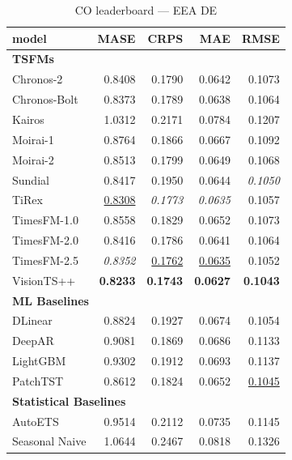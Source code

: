 \begin{table}[H]
\caption{CO leaderboard --- EEA DE}
\centering
\begin{small}
\begin{tabular}{lrrrr}
\toprule
model & MASE & CRPS & MAE & RMSE \\
\midrule
\multicolumn{5}{l}{\textbf{TSFMs}} \\
Chronos-2 & 0.8408 & 0.1790 & 0.0642 & 0.1073 \\
Chronos-Bolt & 0.8373 & 0.1789 & 0.0638 & 0.1064 \\
Kairos & 1.0312 & 0.2171 & 0.0784 & 0.1207 \\
Moirai-1 & 0.8764 & 0.1866 & 0.0667 & 0.1092 \\
Moirai-2 & 0.8513 & 0.1799 & 0.0649 & 0.1068 \\
Sundial & 0.8417 & 0.1950 & 0.0644 & \textit{0.1050} \\
TiRex & \underline{0.8308} & \textit{0.1773} & \textit{0.0635} & 0.1057 \\
TimesFM-1.0 & 0.8558 & 0.1829 & 0.0652 & 0.1073 \\
TimesFM-2.0 & 0.8416 & 0.1786 & 0.0641 & 0.1064 \\
TimesFM-2.5 & \textit{0.8352} & \underline{0.1762} & \underline{0.0635} & 0.1052 \\
VisionTS++ & \textbf{0.8233} & \textbf{0.1743} & \textbf{0.0627} & \textbf{0.1043} \\
\midrule
\multicolumn{5}{l}{\textbf{ML Baselines}} \\
DLinear & 0.8824 & 0.1927 & 0.0674 & 0.1054 \\
DeepAR & 0.9081 & 0.1869 & 0.0686 & 0.1133 \\
LightGBM & 0.9302 & 0.1912 & 0.0693 & 0.1137 \\
PatchTST & 0.8612 & 0.1824 & 0.0652 & \underline{0.1045} \\
\midrule
\multicolumn{5}{l}{\textbf{Statistical Baselines}} \\
AutoETS & 0.9514 & 0.2112 & 0.0735 & 0.1145 \\
Seasonal Naive & 1.0644 & 0.2467 & 0.0818 & 0.1326 \\
\bottomrule
\end{tabular}
\end{small}
\end{table}